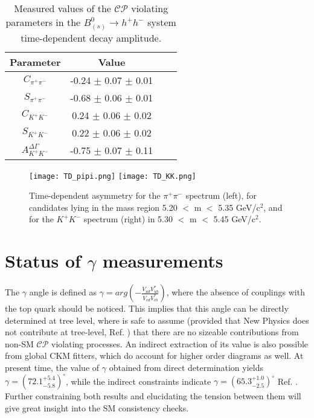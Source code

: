 \documentclass[12pt]{article}
\begin{document}
\begin{table}[b]
\begin{footnotesize}
\begin{center}
\begin{tabular}{c| c c c }	
Parameter &  Value\\
\hline
$C_{\pi^+\pi^-}$ & -0.24 $\pm$ 0.07 $\pm$ 0.01\\
$S_{\pi^+\pi^-}$& -0.68 $\pm$ 0.06 $\pm$ 0.01\\
$C_{K^+K^-}$& 0.24 $\pm$ 0.06 $\pm$ 0.02\\
$S_{K^+K^-}$ &0.22 $\pm$ 0.06 $\pm$ 0.02\\
$A_{K^+K^-}^{\Delta\Gamma}$&-0.75 $\pm$ 0.07 $\pm$ 0.11\\
\end{tabular}
\caption{Measured values of the $\mathcal{CP}$ violating parameters in the $B^0_{(s)}\rightarrow h^+h^-$ system time-dependent decay amplitude. }
\label{tab:bhh}
\end{center}
\end{footnotesize}
\end{table}

\begin{figure}[htb]
\begin{center}
\texttt{[image: TD\_pipi.png]}
\texttt{[image: TD\_KK.png]}
\caption{Time-dependent asymmetry for the $\pi^+\pi^-$ spectrum (left), for candidates lying in the mass region 5.20 $<$ m $<$ 5.35 GeV/c$^2$, and for the $K^+K^-$ spectrum (right) in 5.30 $<$ m $<$ 5.45 GeV/c$^2$.}
\label{fig:bhh}
\end{center}
\end{figure}

\section{Status of $\gamma$ measurements}
The $\gamma$ angle is defined as $\gamma = arg\left(-\frac{V_{ud}V^*_{ub}}{V_{cd}V^*_{cb}}\right)$, where the absence of couplings with the top quark should be noticed. This implies that this angle can be directly determined at tree level, where is safe to assume (provided that New Physics does not contribute at tree-level, Ref. \cite{noNPtree}) that there are no sizeable contributions from  non-SM $\mathcal{CP}$ violating processes. An indirect extraction of its value is also possible from global CKM fitters, which do account for higher order diagrams as well. At present time, the value of $\gamma$ obtained from direct determination yields $\gamma = (72.1^{+5.4}_{-5.8})^\circ$, while the indirect constraints indicate $\gamma = (65.3^{+1.0}_{-2.5})^\circ$ Ref. \cite{CKMfitter}. Further constraining both results and elucidating the tension between them will give great insight into the SM consistency checks. 
\end{document}
